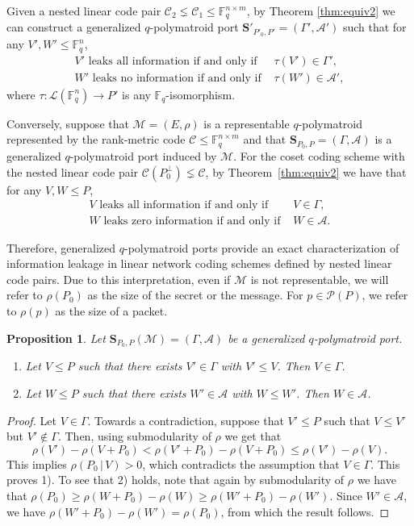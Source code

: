 \documentclass[onecolumn,draftclsnofoot,12pt]{IEEEtran}
\newcommand{\F}{\mathbb{F}}
\renewcommand{\L}{\mathcal{L}}
\newcommand{\A}{\mathcal{A}}
\newcommand{\C}{\mathcal{C}}
\renewcommand{\P}{\mathcal{P}}
\renewcommand{\S}{\mathbf{S}}
\newcommand{\M}{\mathcal{M}}
\theoremstyle{plain} %
\newtheorem{proposition}[theorem]{Proposition}
\theoremstyle{definition}
\begin{document}
Given a nested linear code pair $\C_2\lneq \C_1\leq \F_q^{n\times m}$, by Theorem \ref{thm:equiv2} we can construct a generalized $q$-polymatroid port $\mathbf{S}'_{P'_0,P'} = (\Gamma',\A')$ such that for any $V',W'\leq \F_q^n$, 
\begin{align*}
    V' \text{ leaks all information if and only if }& \tau(V')\in \Gamma', \\
    W' \text{ leaks no information if and only if }&  \tau(W')\in \A',
\end{align*}
where $\tau\colon \L(\F_q^n) \rightarrow P'$ is any $\F_q$-isomorphism.


Conversely, suppose that $\M=(E,\rho)$ is a representable $q$-polymatroid represented by the rank-metric code $\C\leq \F_q^{n\times m}$ and that $\mathbf{S}_{P_0,P}=(\Gamma,\A)$ is a generalized $q$-polymatroid port induced by $\M$. For the coset coding scheme with the nested linear code pair $\C(P_0^\perp)\lneq \C$, by Theorem~\ref{thm:equiv2} we have  that for any $V,W\leq P$, 
\begin{align*}
    V \text{ leaks all information if and only if }& V\in \Gamma, \\
    W \text{ leaks zero information if and only if }& W\in \A.
\end{align*}

Therefore, generalized $q$-polymatroid ports provide an exact characterization of information leakage in linear network coding schemes defined by nested linear code pairs. Due to this interpretation, even if $\M$ is not representable, we will refer to $\rho(P_0)$ as the size of the secret or the message. For $p \in \P(P)$, we refer to $\rho(p)$ as the size of a packet.

\begin{proposition} \label{prop:portaccess}
Let $\S_{P_0,P}(\M)=(\Gamma,\A)$ be a generalized $q$-polymatroid port. 
\begin{enumerate}
    \item Let $V\leq P$ such that there exists $V'\in \Gamma$ with $V'\leq V$. Then $V\in \Gamma$.
    \item Let $W\leq P$ such that there exists $W'\in \A$ with $W\leq W'$. Then $W\in \A$.
\end{enumerate}
\end{proposition}
\begin{proof}
Let $V \in \Gamma$.  Towards a contradiction, suppose that $V' \leq P$ such that $V \leq V'$ but $V' \notin \Gamma$. Then, using submodularity of $\rho$ we get that
\[
    \rho(V') - \rho(V+P_0) < \rho(V'+P_0) - \rho(V+P_0 ) \leq \rho(V') - \rho(V).
\]
This implies $\rho(P_0 \,|\, V)>0$, which contradicts the assumption that $V \in \Gamma$. This proves 1).
To see that 2) holds, note that again by submodularity of $\rho$ we have that $\rho(P_0) \geq \rho(W+P_0)-\rho(W) \geq \rho(W'+P_0)-\rho(W').$ Since 
$W' \in \A$, we have $\rho(W'+P_0)-\rho(W')=\rho(P_0)$, from which the result follows.
\end{proof}
\end{document}

